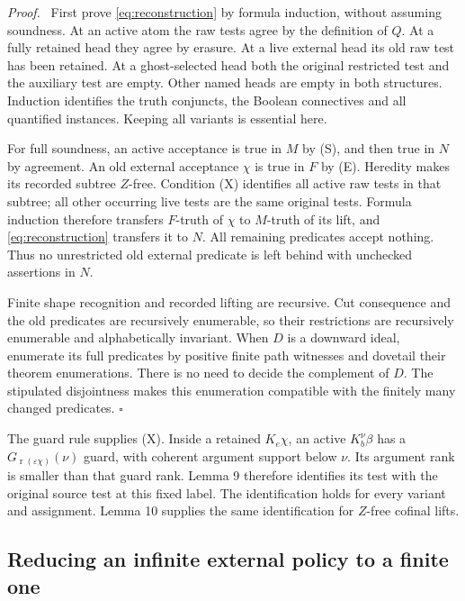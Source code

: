 \documentclass[11pt]{article}
\newcommand{\rk}{\operatorname{r}}
\newcommand{\eps}{\varepsilon}
\newcommand{\qed}{\hfill\ensuremath{\square}}
\newenvironment{proof}{\par\emph{Proof.}\ }{\qed\par}
\begin{document}
\begin{proof}
First prove \eqref{eq:reconstruction} by formula induction, without
assuming soundness. At an active atom the raw tests agree by the
definition of $Q$. At a fully retained head they agree by erasure.
At a live external head its old raw test has been retained. At a
ghost-selected head both the original restricted test and the auxiliary
test are empty. Other named heads are empty in both structures.
Induction identifies the truth conjuncts, the Boolean connectives and
all quantified instances. Keeping all variants is essential here.

For full soundness, an active acceptance is true in $M$ by (S), and
then true in $N$ by agreement. An old external acceptance $\chi$ is
true in $F$ by (E). Heredity makes its recorded subtree $Z$-free.
Condition (X) identifies all active raw tests in that subtree; all
other occurring live tests are the same original tests. Formula
induction therefore transfers $F$-truth of $\chi$ to $M$-truth of its
lift, and \eqref{eq:reconstruction} transfers it to $N$. All remaining
predicates accept nothing. Thus no unrestricted old external predicate
is left behind with unchecked assertions in $N$.

Finite shape recognition and recorded lifting are recursive. Cut
consequence and the old predicates are recursively enumerable, so
their restrictions are recursively enumerable and alphabetically
invariant. When $D$ is a downward ideal, enumerate its full predicates
by positive finite path witnesses and dovetail their theorem
enumerations. There is no need to decide the complement of $D$.
The stipulated disjointness makes this enumeration compatible with
the finitely many changed predicates.
\end{proof}

The guard rule supplies (X). Inside a retained $K_e\chi$, an active
$K_b^\nu\beta$ has a $G_{\rk(\eps\chi)}(\nu)$ guard, with coherent
argument support below $\nu$. Its argument rank is smaller than that
guard rank. Lemma 9 therefore identifies its test with the original
source test at this fixed label. The identification holds for every
variant and assignment. Lemma 10 supplies the same identification for
$Z$-free cofinal lifts.

\subsection*{Reducing an infinite external policy to a finite one}
\end{document}
